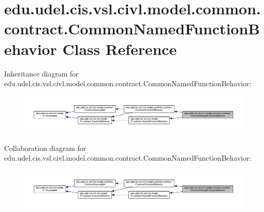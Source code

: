 \hypertarget{classedu_1_1udel_1_1cis_1_1vsl_1_1civl_1_1model_1_1common_1_1contract_1_1CommonNamedFunctionBehavior}{}\section{edu.\+udel.\+cis.\+vsl.\+civl.\+model.\+common.\+contract.\+Common\+Named\+Function\+Behavior Class Reference}
\label{classedu_1_1udel_1_1cis_1_1vsl_1_1civl_1_1model_1_1common_1_1contract_1_1CommonNamedFunctionBehavior}


Inheritance diagram for edu.\+udel.\+cis.\+vsl.\+civl.\+model.\+common.\+contract.\+Common\+Named\+Function\+Behavior\+:
\nopagebreak
\begin{figure}[H]
\begin{center}
\leavevmode
\includegraphics[width=350pt]{classedu_1_1udel_1_1cis_1_1vsl_1_1civl_1_1model_1_1common_1_1contract_1_1CommonNamedFunctionBehavior__inherit__graph}
\end{center}
\end{figure}


Collaboration diagram for edu.\+udel.\+cis.\+vsl.\+civl.\+model.\+common.\+contract.\+Common\+Named\+Function\+Behavior\+:
\nopagebreak
\begin{figure}[H]
\begin{center}
\leavevmode
\includegraphics[width=350pt]{classedu_1_1udel_1_1cis_1_1vsl_1_1civl_1_1model_1_1common_1_1contract_1_1CommonNamedFunctionBehavior__coll__graph}
\end{center}
\end{figure}
